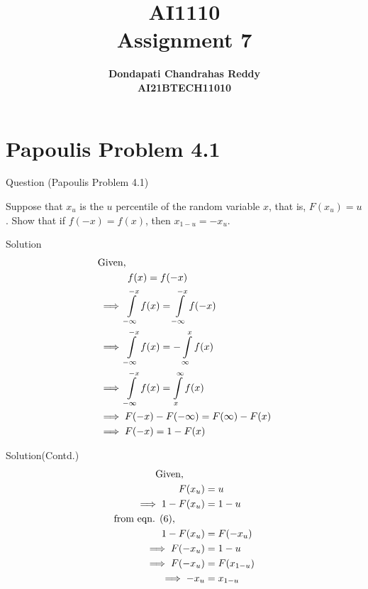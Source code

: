 \documentclass{beamer}
\title{\textbf{AI1110 \\ Assignment 7} }
\author{\textbf{Dondapati Chandrahas Reddy}\\\textbf{AI21BTECH11010}}
\begin{document}
	

\begin{frame}
	\titlepage 
\end{frame}


\section{Papoulis Problem 4.1}
\begin{frame}{Question (Papoulis Problem 4.1)}

Suppose that $x_u$ is the $u$ percentile of the random variable $x$, that is, $F(x_u) = u$. Show that if $f(-x) = f(x)$, then $x_{1-u} = -x_u$.

\end{frame}


\begin{frame}{Solution}
	\begin{align}
		&\text{Given,}\nonumber\\
		&\hspace{7ex}f(x) = f(-x)\\
		&\implies \int\limits_{-\infty}^{-x} f(x) = \int\limits_{-\infty}^{-x} f(-x)\\
		&\implies \int\limits_{-\infty}^{-x} f(x) = -\int\limits_{\infty}^{x} f(x)\\
		&\implies \int\limits_{-\infty}^{-x} f(x) = \int\limits_{x}^{\infty} f(x)\\
		&\implies F(-x) - F(-\infty) = F(\infty) - F(x)\\
		&\implies F(-x) = 1 - F(x)
	\end{align}
\end{frame}


\begin{frame}{Solution(Contd.)}
	\begin{align}
		\text{Given,}\hspace{5ex}&\nonumber\\
		\hspace{7ex} F(x_u) &= u\\
		\implies 1 - F(x_u) &= 1 - u\\
		\text{from eqn. (6),}\hspace{7ex}&\nonumber\\
		1 - F(x_u) &= F(-x_u)\\
		\implies F(-x_u) &= 1-u\\
		\implies F(-x_u) &= F(x_{1-u})\\
		\implies -x_u &= x_{1-u}
	\end{align}
\end{frame}


	

\end{document}
